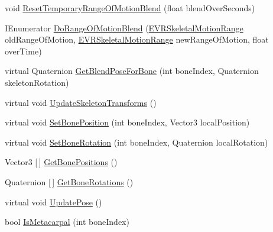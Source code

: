 \begin{DoxyCompactItemize}
\item 
void \mbox{\hyperlink{class_valve_1_1_v_r_1_1_steam_v_r___behaviour___skeleton_aa1beb462a928b9e44965952badd6e511}{Reset\+Temporary\+Range\+Of\+Motion\+Blend}} (float blend\+Over\+Seconds)
\item 
I\+Enumerator \mbox{\hyperlink{class_valve_1_1_v_r_1_1_steam_v_r___behaviour___skeleton_a05b116198babb8d928f402fee958f758}{Do\+Range\+Of\+Motion\+Blend}} (\mbox{\hyperlink{namespace_valve_1_1_v_r_affc8d18345f8f5d36f1ae7b4ce534500}{E\+V\+R\+Skeletal\+Motion\+Range}} old\+Range\+Of\+Motion, \mbox{\hyperlink{namespace_valve_1_1_v_r_affc8d18345f8f5d36f1ae7b4ce534500}{E\+V\+R\+Skeletal\+Motion\+Range}} new\+Range\+Of\+Motion, float over\+Time)
\item 
virtual Quaternion \mbox{\hyperlink{class_valve_1_1_v_r_1_1_steam_v_r___behaviour___skeleton_a01de54e6d66537adbba7550c07f6450c}{Get\+Blend\+Pose\+For\+Bone}} (int bone\+Index, Quaternion skeleton\+Rotation)
\item 
virtual void \mbox{\hyperlink{class_valve_1_1_v_r_1_1_steam_v_r___behaviour___skeleton_a1b0eb3c484d514cc7cf9e44ed4a62956}{Update\+Skeleton\+Transforms}} ()
\item 
virtual void \mbox{\hyperlink{class_valve_1_1_v_r_1_1_steam_v_r___behaviour___skeleton_a0cf24e1fadcf9b15ec31b197a61adb39}{Set\+Bone\+Position}} (int bone\+Index, Vector3 local\+Position)
\item 
virtual void \mbox{\hyperlink{class_valve_1_1_v_r_1_1_steam_v_r___behaviour___skeleton_a54385ac897bfba526738e16654692e4a}{Set\+Bone\+Rotation}} (int bone\+Index, Quaternion local\+Rotation)
\item 
Vector3 \mbox{[}$\,$\mbox{]} \mbox{\hyperlink{class_valve_1_1_v_r_1_1_steam_v_r___behaviour___skeleton_aab0d8d5d9b90db006755859f2bc9c7c7}{Get\+Bone\+Positions}} ()
\item 
Quaternion \mbox{[}$\,$\mbox{]} \mbox{\hyperlink{class_valve_1_1_v_r_1_1_steam_v_r___behaviour___skeleton_a99e16c2ee21edf9e80d3f46e9be0ca7c}{Get\+Bone\+Rotations}} ()
\item 
virtual void \mbox{\hyperlink{class_valve_1_1_v_r_1_1_steam_v_r___behaviour___skeleton_aa14f60be5f1052b0ff098600c31de477}{Update\+Pose}} ()
\item 
bool \mbox{\hyperlink{class_valve_1_1_v_r_1_1_steam_v_r___behaviour___skeleton_a9ba67959ae7bbdcd765d79092e5656a4}{Is\+Metacarpal}} (int bone\+Index)
\end{DoxyCompactItemize}
